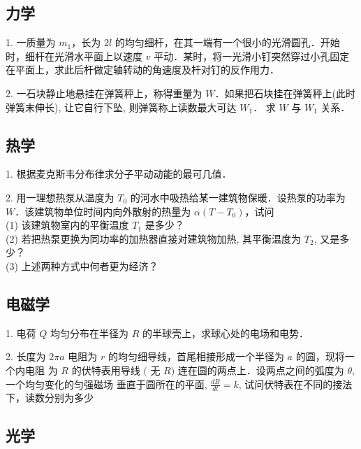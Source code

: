 
\subsection{力学}
1. 一质量为 $m_{1}$，长为 $2l$ 的均匀细杆，在其一端有一个很小的光滑圆孔．开始时，细杆在光滑水平面上以速度 $v$ 平动．某时，将一光滑小钉突然穿过小孔固定在平面上，求此后杆做定轴转动的角速度及杆对钉的反作用力．

2. 一石块静止地悬挂在弹簧秤上，称得重量为 $W$．如果把石块挂在弹簧秤上(此时弹簧末伸长), 让它自行下坠, 则弹簧称上读数最大可达 $W_{1}$． 求 $W$ 与 $W_{1}$ 关系．
\subsection{热学}
1. 根据麦克斯韦分布律求分子平动动能的最可几值．

2. 用一理想热泵从温度为 $T_{0}$ 的河水中吸热给某一建筑物保暖．设热泵的功率为 $W$．该建筑物单位时间内向外散射的热量为 $\alpha\left(T-T_{0}\right)$，试问\\
(1) 该建筑物室内的平衡温度 $T_{1}$ 是多少？\\
(2) 若把热泵更换为同功率的加热器直接对建筑物加热, 其平衡温度为 $T_{2}$, 又是多少？\\
(3) 上述两种方式中何者更为经济？\\
\subsection{电磁学}
1. 电荷 $Q$ 均匀分布在半径为 $R$ 的半球壳上，求球心处的电场和电势．

2. 长度为 $2 \pi a$ 电阻为 $r$ 的均匀细导线，首尾相接形成一个半径为 $a$ 的圆，现将一个内电阻 为 $R$ 的伏特表用导线 $($ 无 $R)$ 连在圆的两点上．设两点之间的弧度为 $\theta$, 一个均匀变化的匀强磁场 垂直于圆所在的平面, $\frac{d B}{d t}=k$, 试问伏特表在不同的接法下，读数分别为多少
\subsection{光学}